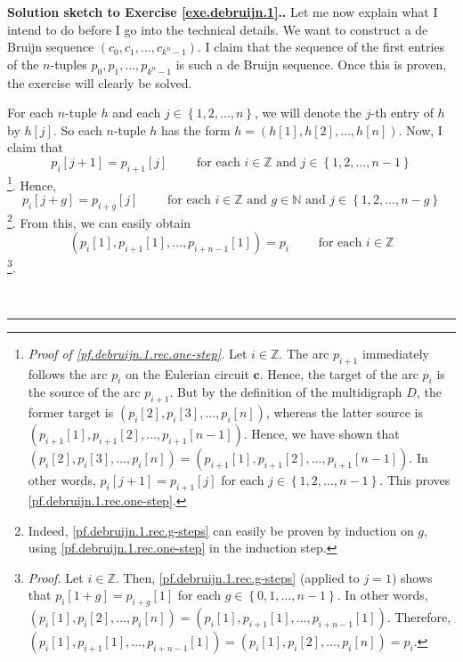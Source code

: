\documentclass[numbers=enddot,12pt,final,onecolumn,notitlepage]{scrartcl}%
\newcounter{exer}
\theoremstyle{definition}
\newenvironment{proof}[1][Proof]{\noindent\textbf{#1.} }{\ \rule{0.5em}{0.5em}}
\newcommand{\NN}{\mathbb{N}}
\newcommand{\ZZ}{\mathbb{Z}}
\newcommand{\set}[1]{\left\{ #1 \right\}}
\newcommand{\tup}[1]{\left( #1 \right)}
\newcommand{\ive}[1]{\left[ #1 \right]}
\begin{document}
\begin{proof}[Solution sketch to Exercise \ref{exe.debruijn.1}.]
Let me now explain what I intend to do before I go into the
technical details. We want to construct a de Bruijn sequence
$\tup{c_0, c_1, \ldots, c_{k^n-1}}$. I claim that the sequence
of the first entries of the $n$-tuples $p_0, p_1, \ldots, p_{k^n-1}$
is such a de Bruijn sequence. Once this is proven, the exercise
will clearly be solved.

For each $n$-tuple $h$ and each $j \in \set{1, 2, \ldots, n}$,
we will denote the $j$-th entry of $h$ by $h\ive{j}$. So each
$n$-tuple $h$ has the form
$h = \tup{h\ive{1}, h\ive{2}, \ldots, h\ive{n}}$.
Now, I claim that
\begin{equation}
p_i\ive{j+1} = p_{i+1}\ive{j}
\qquad \text{ for each } i \in \ZZ
\text{ and } j \in \set{1, 2, \ldots, n-1}
\label{pf.debruijn.1.rec.one-step}
\end{equation}
\footnote{\textit{Proof of \eqref{pf.debruijn.1.rec.one-step}.}
Let $i \in \ZZ$. The arc $p_{i+1}$ immediately follows the arc
$p_i$ on the Eulerian circuit $\mathbf{c}$. Hence, the target of
the arc $p_i$ is the source of the arc $p_{i+1}$. But by the
definition of the multidigraph $D$, the former target is
$\tup{p_i\ive{2}, p_i\ive{3}, \ldots, p_i\ive{n}}$, whereas the
latter source is
$\tup{p_{i+1}\ive{1}, p_{i+1}\ive{2}, \ldots, p_{i+1}\ive{n-1}}$.
Hence, we have shown that
$\tup{p_i\ive{2}, p_i\ive{3}, \ldots, p_i\ive{n}}
= \tup{p_{i+1}\ive{1}, p_{i+1}\ive{2}, \ldots, p_{i+1}\ive{n-1}}$.
In other words, $p_i\ive{j+1} = p_{i+1}\ive{j}$ for each
$j \in \set{1, 2, \ldots, n-1}$. This proves
\eqref{pf.debruijn.1.rec.one-step}.}. Hence,
\begin{equation}
p_i\ive{j+g} = p_{i+g}\ive{j}
\qquad \text{ for each } i \in \ZZ \text{ and } g \in \NN
\text{ and } j \in \set{1, 2, \ldots, n-g}
\label{pf.debruijn.1.rec.g-steps}
\end{equation}
\footnote{Indeed, \eqref{pf.debruijn.1.rec.g-steps} can easily
be proven by induction on $g$, using
\eqref{pf.debruijn.1.rec.one-step} in the induction step.}.
From this, we can easily obtain
\begin{equation}
\tup{p_i\ive{1}, p_{i+1}\ive{1}, \ldots, p_{i+n-1}\ive{1}}
= p_i
\qquad \text{ for each } i \in \ZZ
\label{pf.debruijn.1.=pi}
\end{equation}
\footnote{\textit{Proof.} Let $i \in \ZZ$. Then,
\eqref{pf.debruijn.1.rec.g-steps} (applied to $j=1$) shows that
$p_i\ive{1+g} = p_{i+g}\ive{1}$ for each
$g \in \set{0,1,\ldots,n-1}$. In other words,
$\tup{p_i\ive{1}, p_i\ive{2}, \ldots, p_i\ive{n}}
= \tup{p_i\ive{1}, p_{i+1}\ive{1}, \ldots, p_{i+n-1}\ive{1}}$.
Therefore,
$\tup{p_i\ive{1}, p_{i+1}\ive{1}, \ldots, p_{i+n-1}\ive{1}}
= \tup{p_i\ive{1}, p_i\ive{2}, \ldots, p_i\ive{n}}
= p_i$.}.


\end{proof}
\end{document}
